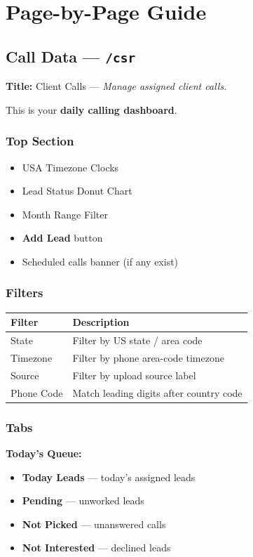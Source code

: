 \documentclass[11pt,a4paper]{article}
\begin{document}
\section{Page-by-Page Guide}

\subsection{Call Data --- \texttt{/csr}}

\textbf{Title:} Client Calls --- \textit{Manage assigned client calls.}

This is your \textbf{daily calling dashboard}.

\subsubsection{Top Section}
\begin{itemize}[noitemsep]
    \item USA Timezone Clocks
    \item Lead Status Donut Chart
    \item Month Range Filter
    \item \textbf{Add Lead} button
    \item Scheduled calls banner (if any exist)
\end{itemize}

\subsubsection{Filters}
\begin{longtable}{@{}p{3cm}p{11cm}@{}}
\toprule
\textbf{Filter} & \textbf{Description} \\
\midrule
State       & Filter by US state / area code \\
Timezone    & Filter by phone area-code timezone \\
Source      & Filter by upload source label \\
Phone Code  & Match leading digits after country code \\
\bottomrule
\end{longtable}

\subsubsection{Tabs}

\textbf{Today's Queue:}
\begin{itemize}[noitemsep]
    \item \textbf{Today Leads} --- today's assigned leads
    \item \textbf{Pending} --- unworked leads
    \item \textbf{Not Picked} --- unanswered calls
    \item \textbf{Not Interested} --- declined leads
\end{itemize}
\end{document}
